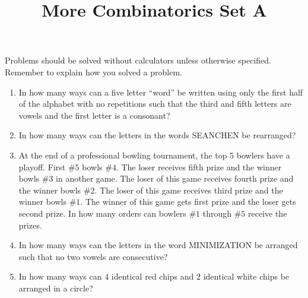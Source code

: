\documentclass{article}
\title{More Combinatorics Set A}
\date{}
\author{}
\begin{document}
\maketitle
\noindent Problems should be solved without calculators unless otherwise 
specified. Remember to explain how you solved a problem.
\begin{enumerate}
    \item In how many ways can a five letter ``word'' be written using only 
        the first half of the alphabet with no repetitions such that the 
        third and fifth letters are vowels and the first letter is a 
        consonant?
        \vspace{3cm}
    \item In how many ways can the letters in the words SEANCHEN be rearranged?
        \vspace{3cm}
    \item At the end of a professional bowling tournament, the top $5$ bowlers have a 
        playoff. First \#$5$ bowls \#$4$. The loser receives fifth prize and the winner 
        bowls \#$3$ in another game. The loser of this game receives fourth prize and the 
        winner bowls \#$2$. The loser of this game receives third prize and the winner bowls 
        \#$1$. The winner of this game gets first prize and the loser gets second prize. 
        In how many orders can bowlers \#$1$ through \#$5$ receive the prizes.
        \vspace{3cm}
    \item In how many ways can the letters in the word MINIMIZATION be arranged 
        such that no two vowels are consecutive?
        \vspace{3cm}
    \item In how many ways can $4$ identical red chips and $2$ identical white chips be 
        arranged in a circle?
        \vspace{3cm}
\end{enumerate}
\end{document}
